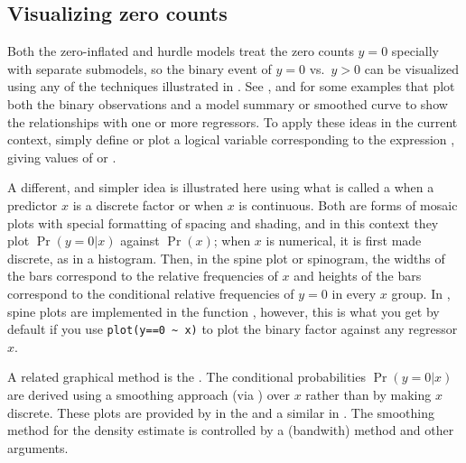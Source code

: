 \documentclass[11pt]{book}\usepackage[]{graphicx}\usepackage[]{color}
\begin{document}
\subsection{Visualizing zero counts}\label{sec:glm-viszero}

Both the zero-inflated and hurdle models treat the zero counts $y=0$ specially with separate
submodels, so the binary event of $y=0$ vs.\ $y>0$ can be visualized using any of the techniques
illustrated in .  See , 
and  for some examples that plot both the binary observations
and a model summary or smoothed curve to show the relationships with one or more
regressors.  To apply these ideas in the current context, simply define or plot a logical
variable corresponding to the expression , giving values of  or .

A different, and simpler idea is illustrated here using what is called a 
\cite{Hummel:96} when a predictor $x$ is a discrete factor or  when $x$ is
continuous.  Both are forms of mosaic plots with special formatting of spacing and shading,
and in this context they plot $\Pr(y=0 | x)$ against $\Pr(x)$; when $x$ is numerical, it
is first made discrete, as in a histogram. 
Then, in the spine plot or spinogram, the widths of the bars correspond to the relative frequencies of $x$
and heights of the bars correspond to the conditional relative frequencies of $y=0$ in every $x$ group. 
In \R, spine plots are implemented in the function , however, this is what you
get by default if you use \verb|plot(y==0 ~ x)| to plot the binary factor against any regressor $x$.

A related graphical method is the 
\citep{HofmannTheus:2005}. The conditional probabilities $\Pr(y=0 | x)$ are derived using
a smoothing approach (via ) over $x$ rather than by making $x$ discrete.
These plots are provided by  in the  and a similar
 in .  The smoothing method for the density estimate is controlled
by a  (bandwith) method and other arguments.
\end{document}

